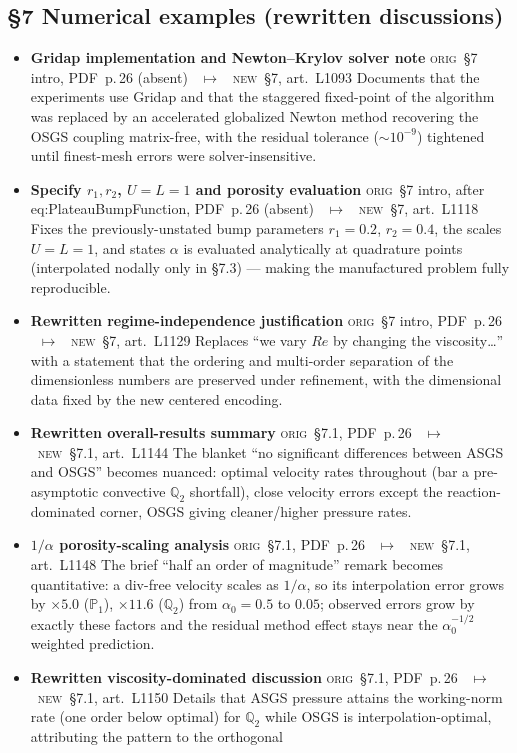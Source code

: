 \documentclass[11pt]{article}
\newcommand{\Orig}{\textcolor{origc}{\footnotesize\textsc{orig}}}
\newcommand{\New}{\textcolor{newc}{\footnotesize\textsc{new}}}
\newcommand{\code}[1]{\textcolor{newc}{\ttfamily\small #1}}
\newcommand{\pdfp}[1]{PDF~p.\,#1}
\newcommand{\artl}[1]{art.\ L#1}       %
\newcommand{\ch}[4]{%
  \item \textbf{#1}\newline
    {\footnotesize\Orig\ #2 \ \textcolor{locc}{$\longmapsto$} \ \New\ #3}\newline
    #4}
\begin{document}
\subsection{\S7 Numerical examples (rewritten discussions)}
\begin{itemize}
\ch{Gridap implementation and Newton--Krylov solver note}
   {\S7 intro, \pdfp{26} (absent)}
   {\S7, \artl{1093}}
   {Documents that the experiments use Gridap and that the staggered fixed-point of the algorithm was
    replaced by an accelerated globalized Newton method recovering the OSGS coupling matrix-free,
    with the residual tolerance ($\sim$$10^{-9}$) tightened until finest-mesh errors were solver-insensitive.}
\ch{Specify $r_1,r_2$, $U{=}L{=}1$ and porosity evaluation}
   {\S7 intro, after \code{eq:PlateauBumpFunction}, \pdfp{26} (absent)}
   {\S7, \artl{1118}}
   {Fixes the previously-unstated bump parameters $r_1{=}0.2$, $r_2{=}0.4$, the scales $U{=}L{=}1$,
    and states $\alpha$ is evaluated analytically at quadrature points (interpolated nodally only in
    \S7.3) --- making the manufactured problem fully reproducible.}
\ch{Rewritten regime-independence justification}
   {\S7 intro, \pdfp{26}}
   {\S7, \artl{1129}}
   {Replaces ``we vary $Re$ by changing the viscosity\dots'' with a statement that the ordering and
    multi-order separation of the dimensionless numbers are preserved under refinement, with the
    dimensional data fixed by the new centered encoding.}
\ch{Rewritten overall-results summary}
   {\S7.1, \pdfp{26}}
   {\S7.1, \artl{1144}}
   {The blanket ``no significant differences between ASGS and OSGS'' becomes nuanced: optimal velocity
    rates throughout (bar a pre-asymptotic convective $\mathbb{Q}_2$ shortfall), close velocity errors
    except the reaction-dominated corner, OSGS giving cleaner/higher pressure rates.}
\ch{$1/\alpha$ porosity-scaling analysis}
   {\S7.1, \pdfp{26}}
   {\S7.1, \artl{1148}}
   {The brief ``half an order of magnitude'' remark becomes quantitative: a div-free velocity scales
    as $1/\alpha$, so its interpolation error grows by $\times5.0$ ($\mathbb{P}_1$), $\times11.6$
    ($\mathbb{Q}_2$) from $\alpha_0{=}0.5$ to $0.05$; observed errors grow by exactly these factors and
    the residual method effect stays near the $\alpha_0^{-1/2}$ weighted prediction.}
\ch{Rewritten viscosity-dominated discussion}
   {\S7.1, \pdfp{26}}
   {\S7.1, \artl{1150}}
   {Details that ASGS pressure attains the working-norm rate (one order below optimal) for
    $\mathbb{Q}_2$ while OSGS is interpolation-optimal, attributing the pattern to the orthogonal
}
\end{itemize}
\end{document}
